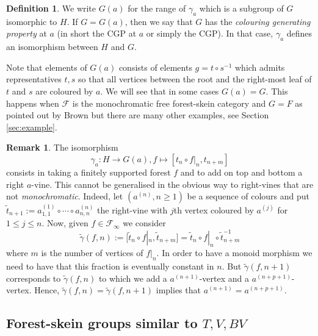 \documentclass[a4paper, 12pt]{amsart}
\numberwithin{equation}{section}
\theoremstyle{definition}
\newtheorem{definition}[theorem]{Definition}
\newtheorem{remark}[theorem]{Remark}
\newcommand{\cF}{\mathcal F}
\newcommand{\ga}{\gamma}
\newcommand{\ti}{\tilde}
\begin{document}
\begin{definition}\label{def:CGP}
We write $G(a)$ for the range of $\ga_a$ which is a subgroup of $G$ isomorphic to $H$.
If $G=G(a)$, then we say that $G$ has the {\it colouring generating property} at $a$ (in short the CGP at $a$ or simply the CGP).
In that case, $\ga_a$ defines an isomorphism between $H$ and $G$.
\end{definition}

Note that elements of $G(a)$ consists of elements $g=t\circ s^{-1}$ which admits representatives $t,s$ so that all vertices between the root and the right-most leaf of $t$ and $s$ are coloured by $a$.
We will see that in some cases $G(a)=G$. This happens when $\cF$ is the monochromatic free forest-skein category and $G=F$ as pointed out by Brown but there are many other examples, see Section \ref{sec:example}.

\begin{remark}
The isomorphism $$\ga_a:H\to G(a),f\mapsto [t_n\circ f|_n, t_{n+m}]$$  consists in taking a finitely supported forest $f$ and to add on top and bottom a right $a$-vine.
This cannot be generalised in the obvious way to right-vines that are not {\it monochromatic}.
Indeed, let $(a^{(n)},n\geq 1)$ be a sequence of colours and put $\ti t_{n+1}:=a^{(1)}_{1,1}\circ\cdots\circ a^{(n)}_{n,n}$ the right-vine with $j$th vertex coloured by $a^{(j)}$ for $1\leq j\leq n.$
Now, given $f\in\cF_\infty$ we consider 
$$\ti\ga(f,n):=[\ti t_{n}\circ f|_{n}, \ti t_{n+m}]= \ti t_n\circ f|_{n} \circ \ti t_{n+m}^{-1}$$ where $m$ is the number of vertices of $f|_{n}$.
In order to have a monoid morphism we need to have that this fraction is eventually constant in $n$.
But $\ti\ga(f,n+1)$ corresponds to $\ti\ga(f,n)$ to which we add a $a^{(n+1)}$-vertex and a $a^{(n+p+1)}$-vertex. 
Hence, $\ti\ga(f,n)=\ti\ga(f,n+1)$ implies that $a^{(n+1)}=a^{(n+p+1)}.$
\end{remark}

\subsection{Forest-skein groups similar to $T,V,BV$}\label{sec:X-version}
\end{document}
